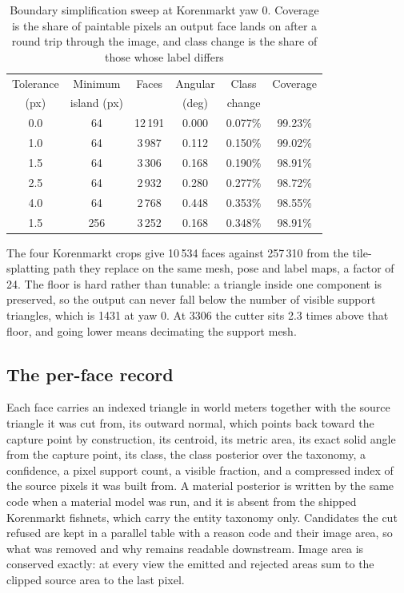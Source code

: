 \documentclass[journal]{IEEEtran}
\begin{document}
\begin{table}[!t]
  \caption{Boundary simplification sweep at Korenmarkt yaw 0. Coverage is the
  share of paintable pixels an output face lands on after a round trip through
  the image, and class change is the share of those whose label differs}
  \label{tab:si-tolerance}
  \centering
  \begin{tabular}{cccccc}
    \toprule
    Tolerance & Minimum & Faces & Angular & Class & Coverage \\
    (px) & island (px) & & (deg) & change & \\
    \midrule
    0.0 & 64  & 12\,191 & 0.000 & 0.077\% & 99.23\% \\
    1.0 & 64  & 3\,987  & 0.112 & 0.150\% & 99.02\% \\
    1.5 & 64  & 3\,306  & 0.168 & 0.190\% & 98.91\% \\
    2.5 & 64  & 2\,932  & 0.280 & 0.277\% & 98.72\% \\
    4.0 & 64  & 2\,768  & 0.448 & 0.353\% & 98.55\% \\
    1.5 & 256 & 3\,252  & 0.168 & 0.348\% & 98.91\% \\
    \bottomrule
  \end{tabular}
\end{table}

The four Korenmarkt crops give 10\,534 faces against 257\,310 from the
tile-splatting path they replace on the same mesh, pose and label maps, a factor
of 24. The floor is hard rather than tunable: a triangle inside one component is
preserved, so the output can never fall below the number of visible support
triangles, which is 1431 at yaw 0. At 3306 the cutter sits 2.3 times above that
floor, and going lower means decimating the support mesh.

\subsection{The per-face record}

Each face carries an indexed triangle in world meters together with the source
triangle it was cut from, its outward normal, which points back toward the
capture point by construction, its centroid, its metric area, its exact solid
angle from the capture point, its class, the class posterior over the taxonomy,
a confidence, a pixel support count, a visible fraction, and a compressed index
of the source pixels it was built from. A material posterior is written by the
same code when a material model was run, and it is absent from the shipped
Korenmarkt fishnets, which carry the entity taxonomy only. Candidates the cut
refused are kept in a parallel table with a reason code and their image area, so
what was removed and why remains readable downstream. Image area is conserved
exactly: at every view the emitted and rejected areas sum to the clipped source
area to the last pixel.
\end{document}
